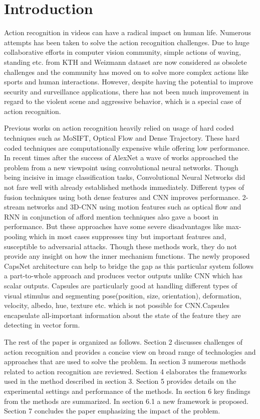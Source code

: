 \documentclass[11pt,english]{article}
\begin{document}
\section{Introduction}
Action recognition in videos can have a radical impact on human life. Numerous attempts has been taken to solve the action recognition challenges. Due to huge collaborative efforts in computer vision community, simple actions of waving, standing etc. from KTH and Weizmann dataset are now considered as obsolete challenges and the community has moved on to solve more complex actions like sports and human interactions. However, despite having the potential to improve security and surveillance applications, there has not been much improvement in regard to the violent scene and aggressive behavior, which is a special case of action recognition.

Previous works on action recognition heavily relied on usage of hard coded techniques such as MoSIFT, Optical Flow and Dense Trajectory. These hard coded techniques are computationally expensive while offering low performance. In recent times after the success of AlexNet a wave of  works approached the problem from a new viewpoint using convolutional neural networks. Though being incisive in image classification tasks, Convolutional Neural Networks did not fare well with already established methods immediately. Different types of fusion techniques using both dense features and CNN improves performance. 2-stream networks and 3D-CNN using motion features such as optical flow and RNN in conjunction of afford mention techniques also gave a boost in performance. But these approaches have some severe disadvantages like max-pooling which in most cases suppresses tiny but important features and, susceptible to adversarial attacks. Though these methods work, they do not provide any insight on how the inner mechanism functions. The newly proposed CapsNet architecture can help to bridge the gap as this particular system follows a part-to-whole approach and produces vector outputs unlike CNN which has scalar outputs. Capsules are particularly good at handling different types of visual stimulus and segmenting pose(position, size, orientation),  deformation, velocity, albedo, hue, texture etc. which is not possible for CNN.Capsules encapsulate all-important information about the state of the feature they are detecting in vector form.


The rest of the paper is organized as follows. Section 2 discusses challenges of action recognition and provides a concise view on broad range of technologies and approaches that are used to solve the problem. In section 3 numerous methods related to action recognition are reviewed. Section 4 elaborates the frameworks used in the method described in section 3. Section 5 provides details on the experimental settings and performance of the methods. In section 6 key findings from the methods are summarized. In section 6.1 a new framework is proposed. Section 7 concludes the paper emphasizing the impact of the problem. 
\end{document}
